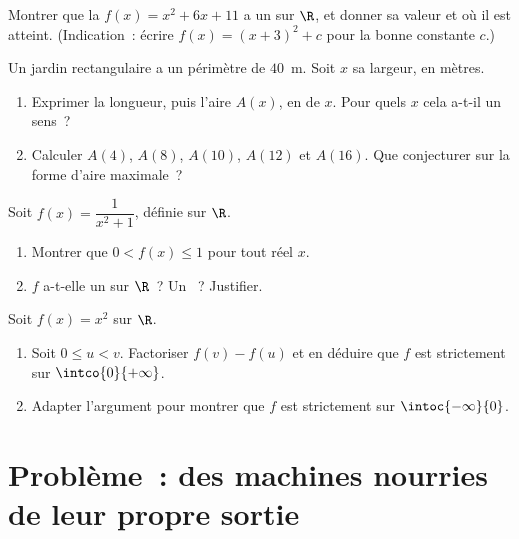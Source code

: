 \begin{exercise}[$\star\star$]\label{exo:g10:functions:7}
Montrer que la  $f(x) = x^2 + 6x + 11$ a un  sur $\R$, et
donner sa valeur et où il est atteint. (Indication~: écrire
$f(x) = (x + 3)^2 + c$ pour la bonne constante $c$.)
\end{exercise}

\begin{exercise}[$\star\star$]\label{exo:g10:functions:8}
Un jardin rectangulaire a un périmètre de $40$~m. Soit $x$ sa largeur, en
mètres.
\begin{enumerate}
  \item Exprimer la longueur, puis l'aire $A(x)$, en  de $x$. Pour
        quels $x$ cela a-t-il un sens~?
  \item Calculer $A(4)$, $A(8)$, $A(10)$, $A(12)$ et $A(16)$. Que
        conjecturer sur la forme d'aire maximale~?
\end{enumerate}
\end{exercise}

\begin{exercise}[$\star\star$]\label{exo:g10:functions:9}
Soit $f(x) = \dfrac{1}{x^2 + 1}$, définie sur $\R$.
\begin{enumerate}
  \item Montrer que $0 < f(x) \leq 1$ pour tout réel $x$.
  \item $f$ a-t-elle un  sur $\R$~? Un ~? Justifier.
\end{enumerate}
\end{exercise}

\begin{exercise}[$\star\star\star$]\label{exo:g10:functions:10}
Soit $f(x) = x^2$ sur $\R$.
\begin{enumerate}
  \item Soit $0 \leq u < v$. Factoriser $f(v) - f(u)$ et en déduire que
        $f$ est strictement  sur $\intco{0}{+\infty}$.
  \item Adapter l'argument pour montrer que $f$ est strictement
         sur $\intoc{-\infty}{0}$.
\end{enumerate}
\end{exercise}

\section{Problème~: des machines nourries de leur propre sortie}

